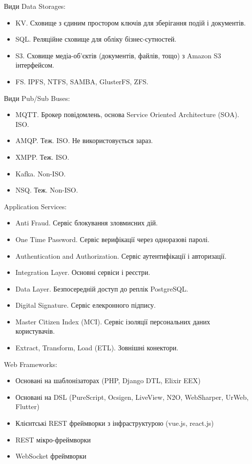 \documentclass{article}
\begin{document}
Види Data Storages:
\begin{itemize}
  \item KV. Сховище з єдиним простором ключів для зберігання подій і документів.
  \item SQL. Реляційне сховище для обліку бізнес-сутностей.
  \item S3. Сховище медіа-об'єктів (документів, файлів, тощо) з Amazon S3 інтерфейсом.
  \item FS. IPFS, NTFS, SAMBA, GlusterFS, ZFS.
\end{itemize}

Види Pub/Sub Buses:
\begin{itemize}
  \item MQTT. Брокер повідомлень, основа Service Oriented Architecture (SOA). ISO.
  \item AMQP. Теж. ISO. Не використовується зараз.
  \item XMPP. Теж. ISO.
  \item Kafka. Non-ISO.
  \item NSQ. Теж. Non-ISO.
\end{itemize}

Application Services:

\begin{itemize}
  \item Anti Fraud. Сервіс блокування зловмисних дій.
  \item One Time Password. Сервіс верифікації через одноразові паролі.
  \item Authentication and Authorization. Сервіс аутентифікації і авторизації.
  \item Integration Layer. Основні сервіси і реєстри.
  \item Data Layer. Безпосередній доступ до реплік PostgreSQL.
  \item Digital Signature. Сервіс елекронного підпису.
  \item Master Citizen Index (MCI). Сервіс ізоляції персональних даних користувачів.
  \item Extract, Transform, Load (ETL). Зовнішні конектори.
\end{itemize}

Web Frameworks:

\begin{itemize}
  \item Основані на шаблонізаторах (PHP, Django DTL, Elixir EEX)
  \item Основані на DSL (PureScript, Ocsigen, LiveView, N2O, WebSharper, UrWeb, Flutter)
  \item Клієнтські REST фреймворки з інфраструктурою (vue.js, react.js)
  \item REST мікро-фреймворки
  \item WebSocket фреймворки
\end{itemize}
\end{document}

